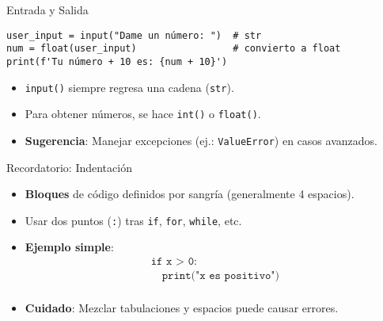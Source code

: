 \documentclass[10pt]{beamer}
\begin{document}
\begin{frame}[fragile]{Entrada y Salida}
\begin{verbatim}
user_input = input("Dame un número: ")  # str
num = float(user_input)                 # convierto a float
print(f'Tu número + 10 es: {num + 10}')
\end{verbatim}
\begin{itemize}
  \item \texttt{input()} siempre regresa una cadena (\texttt{str}).
  \item Para obtener números, se hace \texttt{int()} o \texttt{float()}.
  \item \textbf{Sugerencia}: Manejar excepciones (ej.: \texttt{ValueError}) en casos avanzados.
\end{itemize}
\end{frame}

\begin{frame}{Recordatorio: Indentación}
  \begin{itemize}
    \item \textbf{Bloques} de código definidos por sangría (generalmente 4 espacios).
    \item Usar dos puntos (\texttt{:}) tras \texttt{if}, \texttt{for}, \texttt{while}, etc.
    \item \textbf{Ejemplo simple}:
    \[
      \begin{array}{l}
      \texttt{if x > 0:} \\
      \quad \texttt{print("x es positivo")} \\
      \end{array}
    \]
    \item \textbf{Cuidado}: Mezclar tabulaciones y espacios puede causar errores.
  \end{itemize}
\end{frame}

\end{document}
